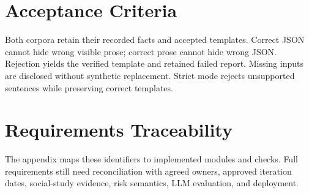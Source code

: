 \section{Acceptance Criteria}
Both corpora retain their recorded facts and accepted templates. Correct JSON cannot hide wrong visible prose; correct prose cannot hide wrong JSON. Rejection yields the verified template and retained failed report. Missing inputs are disclosed without synthetic replacement. Strict mode rejects unsupported sentences while preserving correct templates.
\section{Requirements Traceability}
The appendix maps these identifiers to implemented modules and checks. Full requirements still need reconciliation with agreed owners, approved iteration dates, social-study evidence, risk semantics, LLM evaluation, and deployment.
